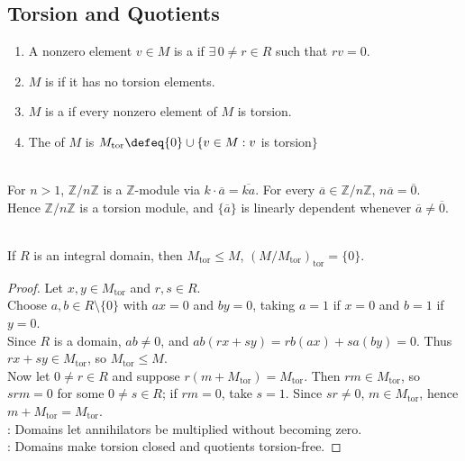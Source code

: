 \subsection{Torsion and Quotients}

\begin{definition} \label{def:module-torsion} 
\begin{enumerate}[label=(\roman*)]
\setlength{\itemsep}{0pt}
\item A nonzero element $v\in M$ is a  if $\exists\,0\neq r\in R$ such that $rv=0$.
\item $M$ is  if it has no torsion elements.
\item $M$ is a  if every nonzero element of $M$ is torsion.
\item The  of $M$ is $M_{\operatorname{tor}}\defeq\{0\}\cup\{v\in M:v$ is torsion$\}$
\end{enumerate}
\end{definition}

\begin{example} \label{ex:zn-is-torsion-module} \\
For $n>1$, $\mathbb{Z}/n\mathbb{Z}$ is a $\mathbb{Z}$-module via $k\cdot \overline{a}=\overline{ka}$. For every $\overline{a}\in\mathbb{Z}/n\mathbb{Z}$, $n\overline{a}=\overline{0}$.\\
Hence $\mathbb{Z}/n\mathbb{Z}$ is a torsion module, and $\{\overline{a}\}$ is linearly dependent whenever $\overline{a}\neq\overline{0}$.
\end{example}

\begin{proposition} \label{prop:torsion-submodule-over-domain} \\
If $R$ is an integral domain, then $M_{\operatorname{tor}}\leq M$, $(M/M_{\operatorname{tor}})_{\operatorname{tor}}=\{0\}$.
\begin{proof}
Let $x,y\in M_{\operatorname{tor}}$ and $r,s\in R$.\\
Choose $a,b\in R\setminus\{0\}$ with $ax=0$ and $by=0$, taking $a=1$ if $x=0$ and $b=1$ if $y=0$.\\
Since $R$ is a domain, $ab\neq0$, and $ab(rx+sy)=rb(ax)+sa(by)=0$. Thus $rx+sy\in M_{\operatorname{tor}}$, so $M_{\operatorname{tor}}\leq M$.\\
Now let $0\neq r\in R$ and suppose $r(m+M_{\operatorname{tor}})=M_{\operatorname{tor}}$. Then $rm\in M_{\operatorname{tor}}$, so $srm=0$ for some $0\neq s\in R$; if $rm=0$, take $s=1$. Since $sr\neq0$, $m\in M_{\operatorname{tor}}$, hence $m+M_{\operatorname{tor}}=M_{\operatorname{tor}}$.\\
: Domains let annihilators be multiplied without becoming zero.\\
: Domains make torsion closed and quotients torsion-free.
\end{proof}
\end{proposition}

